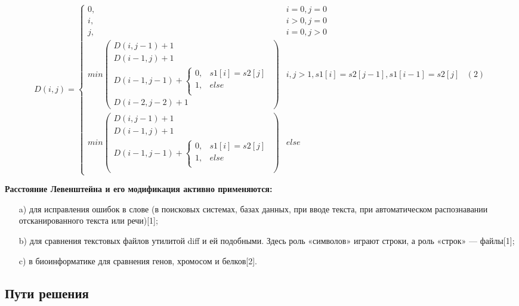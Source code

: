 \documentclass[a4paper,14pt]{article} %
\begin{document}
        $$
        D(i, j) = 
        \left\{
		\begin{array}{lll}
 			0 , & i = 0, j = 0  \\
			i , & i > 0, j = 0  \\
			j , &i = 0, j > 0\\
			min
			\left(
				\begin{array}{lll}
					D(i, j - 1) + 1 \\
					D(i - 1, j ) + 1 \\
					D(i - 1 , j - 1) +  
								\left\{
									\begin{array}{lll}
										0, & s1[i] = s2[j] \\
										1, & else \\
									\end{array}
								\right.\\
					D(i - 2,j - 2) + 1
				\end{array}
			\right) & i, j > 1, s1[i] = s2[j - 1], s1[i - 1] = s2[j]  & (2)\\
			min
			\left(
				\begin{array}{lll}
					D(i, j - 1) + 1 \\
					D(i - 1, j ) + 1 \\
					D(i - 1 , j - 1) +  
								\left\{
									\begin{array}{lll}
										0, & s1[i] = s2[j] \\
										1, & else \\
									\end{array}
								\right.\\
				\end{array}
			\right) &else
 		\end{array}
	\right.
        $$
        \hfill
        
        \textbf{Расстояние Левенштейна и его модификация активно применяются:}
	\begin{enumerate}
		\item[a)] для исправления ошибок в слове (в поисковых системах, базах данных, при вводе текста, при автоматическом распознавании отсканированного текста или речи)[1];
		\item[b)] для сравнения текстовых файлов утилитой diff и ей подобными. Здесь роль «символов» играют строки, а роль «строк» — файлы[1];
		\item[c)]  в биоинформатике для сравнения генов, хромосом и белков[2].
	\end{enumerate}
	
        \subsection{Пути решения}
        \hfill
        
\end{document}
